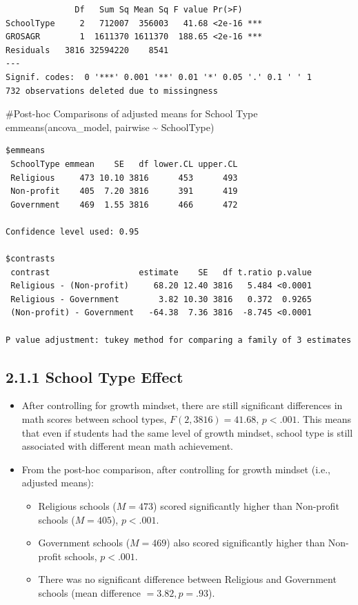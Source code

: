\documentclass[
  letterpaper,
  DIV=11,
  numbers=noendperiod]{scrreprt}
\newenvironment{Shaded}{\begin{snugshade}}{\end{snugshade}}
\newcommand{\CommentTok}[1]{\textcolor[rgb]{0.37,0.37,0.37}{#1}}
\newcommand{\FunctionTok}[1]{\textcolor[rgb]{0.28,0.35,0.67}{#1}}
\newcommand{\NormalTok}[1]{\textcolor[rgb]{0.00,0.23,0.31}{#1}}
\newcommand{\SpecialCharTok}[1]{\textcolor[rgb]{0.37,0.37,0.37}{#1}}
\begin{document}
\begin{verbatim}
              Df   Sum Sq Mean Sq F value Pr(>F)    
SchoolType     2   712007  356003   41.68 <2e-16 ***
GROSAGR        1  1611370 1611370  188.65 <2e-16 ***
Residuals   3816 32594220    8541                   
---
Signif. codes:  0 '***' 0.001 '**' 0.01 '*' 0.05 '.' 0.1 ' ' 1
732 observations deleted due to missingness
\end{verbatim}

\begin{Shaded}
\begin{Highlighting}[]
\CommentTok{\#Post{-}hoc Comparisons of adjusted means for School Type }
\FunctionTok{emmeans}\NormalTok{(ancova\_model, pairwise }\SpecialCharTok{\textasciitilde{}}\NormalTok{ SchoolType) }
\end{Highlighting}
\end{Shaded}

\begin{verbatim}
$emmeans
 SchoolType emmean    SE   df lower.CL upper.CL
 Religious     473 10.10 3816      453      493
 Non-profit    405  7.20 3816      391      419
 Government    469  1.55 3816      466      472

Confidence level used: 0.95 

$contrasts
 contrast                  estimate    SE   df t.ratio p.value
 Religious - (Non-profit)     68.20 12.40 3816   5.484 <0.0001
 Religious - Government        3.82 10.30 3816   0.372  0.9265
 (Non-profit) - Government   -64.38  7.36 3816  -8.745 <0.0001

P value adjustment: tukey method for comparing a family of 3 estimates 
\end{verbatim}

\subsection*{2.1.1 School Type Effect}\label{school-type-effect}

\begin{itemize}
\item
  After controlling for growth mindset, there are still significant
  differences in math scores between school types,
  \(F(2,3816)=41.68, \, p<.001\). This means that even if students had
  the same level of growth mindset, school type is still associated with
  different mean math achievement.
\item
  From the post-hoc comparison, after controlling for growth mindset
  (i.e., adjusted means):

  \begin{itemize}
  \item
    Religious schools (\(M = 473\)) scored significantly higher than
    Non-profit schools (\(M = 405\)), \(p < .001\).
  \item
    Government schools (\(M = 469\)) also scored significantly higher
    than Non-profit schools, \(p < .001\).
  \item
    There was no significant difference between Religious and Government
    schools (mean difference \(= 3.82, p = .93\)).
  \end{itemize}
\end{itemize}
\end{document}
